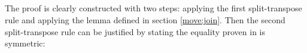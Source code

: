 \documentclass{l4proj}
\begin{document}
\begin{code}
\>[4]\AgdaSpace{}%
\AgdaSpace{}%
\AgdaSymbol{(}\AgdaSpace{}%
\AgdaSpace{}%
\AgdaSymbol{(}\AgdaSpace{}%
\AgdaSymbol{))}\<%
\\
%
\>[2]\AgdaSpace{}%
\AgdaSpace{}%
\AgdaSymbol{(}\AgdaSpace{}%
\AgdaSymbol{)}\AgdaSpace{}%
\AgdaSymbol{(}\AgdaSpace{}%
\AgdaSpace{}%
\AgdaSymbol{)}\AgdaSpace{}%
\<%
\\
\>[2][@{}l@{\AgdaIndent{0}}]%
\>[4]\AgdaSpace{}%
\AgdaSpace{}%
\AgdaSymbol{(}\AgdaSpace{}%
\AgdaSpace{}%
\AgdaSymbol{(}\AgdaSpace{}%
\AgdaSymbol{(}\AgdaSpace{}%
\AgdaSymbol{(}\AgdaSpace{}%
\AgdaSymbol{)}\AgdaSpace{}%
\AgdaSymbol{)))}\<%
\\
%
\>[2]\AgdaSpace{}%
\AgdaSpace{}%
\AgdaSymbol{(}\AgdaSpace{}%
\AgdaSymbol{(}\AgdaSpace{}%
\AgdaSymbol{(}\AgdaSpace{}%
\AgdaSymbol{)}\AgdaSpace{}%
\AgdaSymbol{))}\AgdaSpace{}%
\<%
\\
\>[2][@{}l@{\AgdaIndent{0}}]%
\>[4]\<%
\end{code}
The proof is clearly constructed with two steps: applying the first split-transpose rule and applying the lemma  defined in section \ref{move:join}. Then the second split-transpose rule can be justified by stating the equality proven in  is symmetric:
\end{document}
